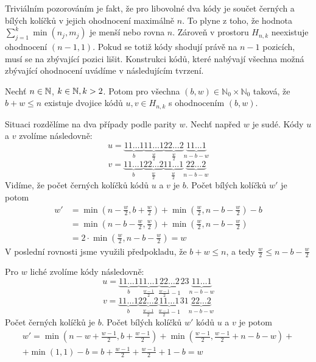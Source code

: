 Triviálním pozorováním je fakt, že pro libovolné dva kódy je součet černých a bílých kolíčků v jejich ohodnocení maximálně $n$. To plyne z toho, že hodnota $\sum_{j = 1}^k  \min(n_j, m_j)$ je menší nebo rovna $n$. Zároveň v prostoru $H_{n,k}$ neexistuje ohodnocení $(n-1,1)$. Pokud se totiž kódy shodují právě na $n-1$ pozicích, musí se na zbývající pozici lišit. Konstrukci kódů, které nabývají všechna možná zbývající ohodnocení uvádíme v následujícím tvrzení.
\begin{tvrz}\label{tvrzohodnoceni}
    Nechť $n \in \mathbb{N}$, $k \in \mathbb{N}, k>2$. Potom pro všechna $(b,w)\in \mathbb{N}_0 \times \mathbb{N}_0$ taková, že $b + w \leq n$ existuje dvojice kódů $u,v \in H_{n,k}$ s ohodnocením $(b,w)$.
\end{tvrz}
\begin{dukaz}

    
    
    Situaci rozdělíme na dva případy podle parity $w$. Nechť napřed $w$ je sudé. Kódy $u$ a $v$ zvolíme následovně:
\[
  u = 
    \underbrace{11\dots1}_{b}
    \underbrace{11\dots1}_{\frac{w}{2}}
    \underbrace{22\dots2}_{\frac{w}{2}}
    \underbrace{11\dots1}_{n-b-w}
 \]
 \[
  v = 
    \underbrace{11\dots1}_{b}
    \underbrace{22\dots2}_{\frac{w}{2}}
    \underbrace{11\dots1}_{\frac{w}{2}}
    \underbrace{22\dots2}_{n-b-w}
 \]
Vidíme, že počet černých kolíčků kódů $u$ a $v$ je $b$. Počet bílých kolíčků $w'$ je potom
\begin{align*} 
w' &= \min\left(n - \frac{w}{2}, b + \frac{w}{2}\right) + \min\left(\frac{w}{2}, n - b - \frac{w}{2}\right) - b \\ 
&= \min\left(n - b - \frac{w}{2}, \frac{w}{2}\right) + \min\left(\frac{w}{2}, n - b - \frac{w}{2}\right) \\
&= 2\cdot\min\left(\frac{w}{2}, n - b - \frac{w}{2}\right) = w
\end{align*}
V poslední rovnosti jsme využili předpokladu, že $b+w \leq n$, a tedy $\frac{w}{2} \leq n - b - \frac{w}{2}$

Pro $w$ liché zvolíme kódy následovně:
\[
  u = 
    \underbrace{11\dots1}_{b}
    \underbrace{11\dots1}_{\frac{w-1}{2}}
    \underbrace{22\dots2}_{\frac{w-1}{2}-1}
    2
    3
    \underbrace{11\dots1}_{n-b-w}
 \]
 \[
  v = 
    \underbrace{11\dots1}_{b}
    \underbrace{22\dots2}_{\frac{w-1}{2}}
    \underbrace{11\dots1}_{\frac{w-1}{2}-1}
    3
    1
    \underbrace{22\dots2}_{n-b-w}
 \]
Počet černých kolíčků je $b$. Počet bílých kolíčků $w'$ kódů $u$ a $v$ je potom
\begin{align*} 
w' = \min\left(n-w+\frac{w-1}{2}, b + \frac{w-1}{2}\right) + \min\left(\frac{w-1}{2}, \frac{w-1}{2} + n-b-w\right) + \\ +\min(1,1) - b 
 = b + \frac{w-1}{2} + \frac{w-1}{2} + 1 - b = w
\end{align*}
\end{dukaz}

